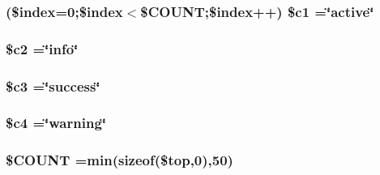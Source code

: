 \subsubsection[{\$c1}]{ (\$index=0;\$index$<$\$C\+O\+U\+N\+T;\$index++) \$c1 =\char`\"{}active\char`\"{}}\label{top__players_8php_a751ee5fcf0f1391e93992319585f6e83}
\hypertarget{top__players_8php_a7d0ce9eb4b126a1a12c7dade4f7ab7ef}{}
\subsubsection[{\$c2}]{\setlength{\rightskip}{0pt plus 5cm}\$c2 =\char`\"{}info\char`\"{}}\label{top__players_8php_a7d0ce9eb4b126a1a12c7dade4f7ab7ef}
\hypertarget{top__players_8php_a78a28e488f33dbd56e562b07dc3862e3}{}
\subsubsection[{\$c3}]{\setlength{\rightskip}{0pt plus 5cm}\$c3 =\char`\"{}success\char`\"{}}\label{top__players_8php_a78a28e488f33dbd56e562b07dc3862e3}
\hypertarget{top__players_8php_a480a6698b6eb8bfee885295be554a1e7}{}
\subsubsection[{\$c4}]{\setlength{\rightskip}{0pt plus 5cm}\$c4 =\char`\"{}warning\char`\"{}}\label{top__players_8php_a480a6698b6eb8bfee885295be554a1e7}
\hypertarget{top__players_8php_a2c72ce2b8a6bae42166f51c759f34d31}{}
\subsubsection[{\$\+C\+O\+U\+N\+T}]{\setlength{\rightskip}{0pt plus 5cm}\$C\+O\+U\+N\+T =min(sizeof(\$top,0),50)}\label{top__players_8php_a2c72ce2b8a6bae42166f51c759f34d31}
\hypertarget{top__players_8php_a0cf5dd496d9f5ff1edf00d234771dcfe}{}
